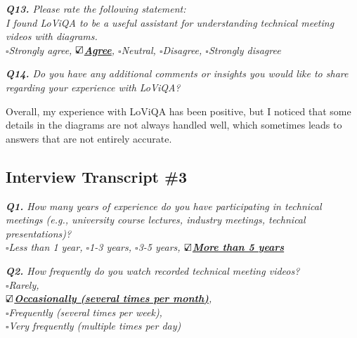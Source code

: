 \vspace*{1em}\noindent\textit{\textbf{Q13.} Please rate the following statement:
\\[.5em]
\textit{I found LoViQA to be a useful assistant for understanding technical meeting videos with diagrams.}
\\[.5em]
\indent $\square$Strongly agree,
\underline{\bfseries$\text{\rlap{$\checkmark$}}\square$Agree},
$\square$Neutral,
$\square$Disagree,
$\square$Strongly disagree
}

\vspace*{1em}

\noindent\textit{\textbf{Q14.} Do you have any additional comments or insights you would like to share regarding your experience with LoViQA?
}

\begin{samepage}
\begin{mdframed}[style=MyFrame]
Overall, my experience with LoViQA has been positive, but I noticed that some details in the diagrams are not always handled well, which sometimes leads to answers that are not entirely accurate.
\end{mdframed}
\end{samepage}



\noindent\hrulefill 

\subsection{Interview Transcript \#3}
\label{appendix:transcript3}


\vspace*{.6cm}

\vspace*{1em}\noindent\textit{\textbf{Q1.} How many years of experience do you have participating in technical meetings (e.g., university course lectures, industry meetings, technical presentations)?
\\[.5em]
        \indent $\square$Less than 1 year,
        $\square$1-3 years,
        $\square$3-5 years,
       \underline{\bfseries$\text{\rlap{$\checkmark$}}\square$More than 5 years}
}


\vspace*{1em}\noindent\textit{\textbf{Q2.} How frequently do you watch recorded technical meeting videos?
\\[.5em]
        \indent $\square$Rarely,\\
        \indent\underline{\bfseries$\text{\rlap{$\checkmark$}}\square$Occasionally (several times per month)},\\
        \indent$\square$Frequently (several times per week),\\
        \indent$\square$Very frequently (multiple times per day)
}

